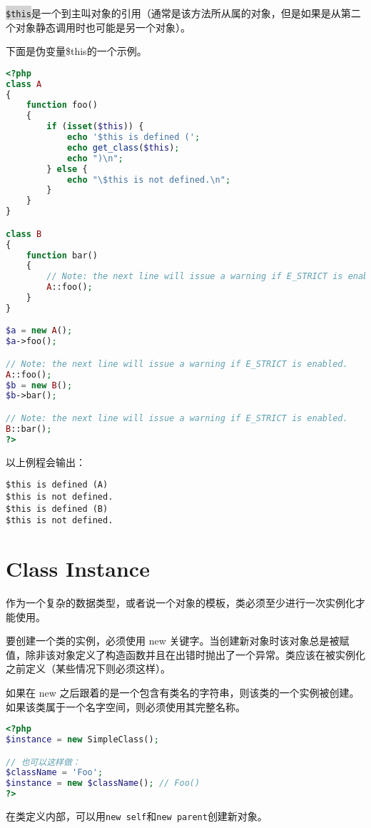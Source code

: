\colorbox{lightgray}{\texttt{\$this}}是一个到主叫对象的引用（通常是该方法所从属的对象，但是如果是从第二个对象静态调用时也可能是另一个对象）。


下面是伪变量\$this的一个示例。

\begin{lstlisting}[language=PHP]
<?php
class A
{
    function foo()
    {
        if (isset($this)) {
            echo '$this is defined (';
            echo get_class($this);
            echo ")\n";
        } else {
            echo "\$this is not defined.\n";
        }
    }
}

class B
{
    function bar()
    {
        // Note: the next line will issue a warning if E_STRICT is enabled.
        A::foo();
    }
}

$a = new A();
$a->foo();

// Note: the next line will issue a warning if E_STRICT is enabled.
A::foo();
$b = new B();
$b->bar();

// Note: the next line will issue a warning if E_STRICT is enabled.
B::bar();
?>
\end{lstlisting}

以上例程会输出：

\begin{verbatim}
$this is defined (A)
$this is not defined.
$this is defined (B)
$this is not defined.
\end{verbatim}


\section{Class Instance}

作为一个复杂的数据类型，或者说一个对象的模板，类必须至少进行一次实例化才能使用。

要创建一个类的实例，必须使用 new 关键字。当创建新对象时该对象总是被赋值，除非该对象定义了构造函数并且在出错时抛出了一个异常。类应该在被实例化之前定义（某些情况下则必须这样）。

如果在 new 之后跟着的是一个包含有类名的字符串，则该类的一个实例被创建。如果该类属于一个名字空间，则必须使用其完整名称。



\begin{lstlisting}[language=PHP]
<?php
$instance = new SimpleClass();

// 也可以这样做：
$className = 'Foo';
$instance = new $className(); // Foo()
?>
\end{lstlisting}

在类定义内部，可以用\texttt{new self}和\texttt{new parent}创建新对象。

